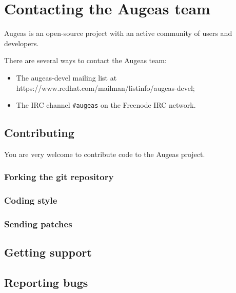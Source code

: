 \chapter{Contacting the Augeas team}

Augeas is an open-source project with an active community of users and developers.

There are several ways to contact the Augeas team:

\begin{itemize}
\item
  The augeas-devel mailing list at https://www.redhat.com/mailman/listinfo/augeas-devel;
\item
  The IRC channel \verb!#augeas! on the Freenode IRC network.
\end{itemize}


\section{Contributing}

You are very welcome to contribute code to the Augeas project.

\subsection{Forking the git repository}

\subsection{Coding style}

\subsection{Sending patches}

\section{Getting support}

\section{Reporting bugs}


